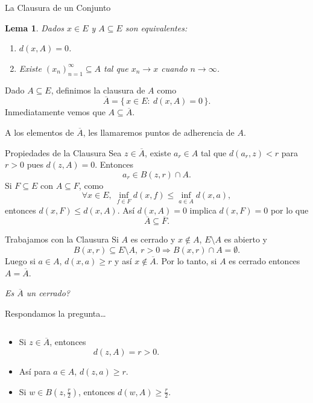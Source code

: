 \documentclass[utf8]{beamer}
\theoremstyle{plain}
\newtheorem{Lem}{Lema}                 %
\theoremstyle{definition}
\theoremstyle{remark}
\numberwithin{equation}{section}
\newcommand{\set}[1]{\{\,#1\,\}}    %
\renewcommand{\geq}{\geqslant}          %
\renewcommand{\leq}{\leqslant}          %
\newcommand{\less}{\setminus}           %
\newcommand{\To}{\Rightarrow}
\newcommand{\ov}{\overline}
\begin{document}
\begin{frame}{La Clausura de un Conjunto}
    \begin{Lem}
        Dados $x\in E$ y $A\subseteq E$ son equivalentes:
        \begin{enumerate}
            \item $d(x,A)=0$.
            \item Existe $(x_n)_{n=1}^\infty\subseteq A$ tal que $x_n\to x$ cuando $n\to \infty$.
        \end{enumerate}
    \end{Lem}
    Dado $A\subseteq E$, definimos la \alert{clausura} de $A$ como 
    $$\ov A=\set{x\in E:\ d(x,A)=0}.$$
    Inmediatamente vemos que $A\subseteq \ov A$.\par 
    A los elementos de $\ov A$, les llamaremos \alert{puntos de adherencia} de $A$.
\end{frame}

\begin{frame}{Propiedades de la Clausura}
    Sea $z\in \ov A$, existe $a_r\in A$ tal que $d(a_r,z)<r$ para $r>0$ pues $d(z,A)=0$. Entonces 
    $$a_r\in B(z,r)\cap A.$$
    Si $F\subseteq E$ con $A\subseteq F$, como 
    $$\forall x\in E,\ \inf_{f\in F} d(x,f)\leq \inf_{a\in A} d(x,a),$$
    entonces $d(x,F)\leq d(x,A)$. As\'i $d(x,A)=0$ implica $d(x,F)=0$ por lo que
    $$\ov A\subseteq \ov F.$$
\end{frame}

\begin{frame}{Trabajamos con la Clausura}
    Si $A$ es cerrado y $x\not\in A$, $E\less A$ es abierto y 
    $$B(x,r)\subseteq E\less A,\ r>0\To B(x,r)\cap A=\emptyset.$$
    Luego si $a\in A$, $d(x,a)\geq r$ y as\'i $x\not\in\ov A$. Por lo tanto, si $A$ es cerrado entonces $A=\ov A$.
    \begin{center}
        \emph{Es $\ov A$ un cerrado?}
    \end{center}
\end{frame}

\begin{frame}{Respondamos la pregunta\dots}
    \begin{columns}
    \begin{column}{0.5\textwidth}
        \begin{itemize}
            \item  Si $z\in\ov A$, entonces 
            $$d(z,A)=r>0.$$ 
            \pause
            \item As\'i para $a\in A$, $d(z,a)\geq r$.
            \pause
            \item  Si $w\in B\left(z,\frac r2\right)$, entonces $d(w,A)\geq \frac r2$. 
        \end{itemize}
       
     \end{column}
     \begin{column}{0.5\textwidth}  %
        
     \end{column}
     \end{columns}
\end{frame}
\end{document}
